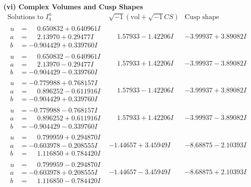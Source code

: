 \documentclass[1p]{elsarticle_modified}
\theoremstyle{definition}
\newcommand{\I}{\sqrt{-1}}
\begin{document}
\newpage\flushleft \textbf{(vi) Complex Volumes and Cusp Shapes}
$$\begin{array}{c|c|c}  
\text{Solutions to }I^u_{4}& \I (\text{vol} + \sqrt{-1}CS) & \text{Cusp shape}\\
 \hline 
\begin{aligned}
u &= \phantom{-}0.650832 + 0.640961 I \\
a &= \phantom{-}2.13970 + 0.29477 I \\
b &= -0.904429 + 0.339760 I\end{aligned}
 & \phantom{-}1.57933 - 1.42206 I & -3.99937 + 3.89082 I \\ \hline\begin{aligned}
u &= \phantom{-}0.650832 - 0.640961 I \\
a &= \phantom{-}2.13970 - 0.29477 I \\
b &= -0.904429 - 0.339760 I\end{aligned}
 & \phantom{-}1.57933 + 1.42206 I & -3.99937 - 3.89082 I \\ \hline\begin{aligned}
u &= -0.779988 + 0.768157 I \\
a &= \phantom{-}0.896252 - 0.611916 I \\
b &= -0.904429 + 0.339760 I\end{aligned}
 & \phantom{-}1.57933 - 1.42206 I & -3.99937 + 3.89082 I \\ \hline\begin{aligned}
u &= -0.779988 - 0.768157 I \\
a &= \phantom{-}0.896252 + 0.611916 I \\
b &= -0.904429 - 0.339760 I\end{aligned}
 & \phantom{-}1.57933 + 1.42206 I & -3.99937 - 3.89082 I \\ \hline\begin{aligned}
u &= \phantom{-}0.799959 + 0.294870 I \\
a &= -0.603978 - 0.208555 I \\
b &= \phantom{-}1.116850 + 0.784420 I\end{aligned}
 & -1.44657 + 3.45949 I & -8.68875 - 2.10393 I \\ \hline\begin{aligned}
u &= \phantom{-}0.799959 - 0.294870 I \\
a &= -0.603978 + 0.208555 I \\
b &= \phantom{-}1.116850 - 0.784420 I\end{aligned}
 & -1.44657 - 3.45949 I & -8.68875 + 2.10393 I \\ \hline\begin{aligned}

\end{aligned}
\end{array}$$
\end{document}
